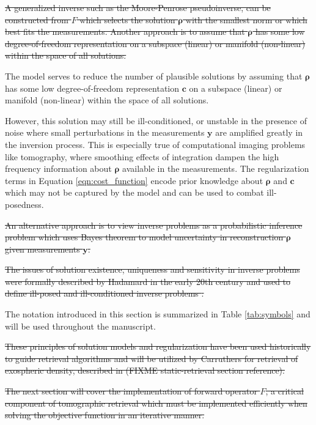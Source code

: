 \documentclass[pdflatex,twocolumn,sn-mathphys-num]{sn-jnl}
\newcommand{\st}[1]{{\color{red}\sout{#1}}}
\begin{document}
\st{A generalized inverse such as the Moore-Penrose pseudoinverse, can be constructed from $F$ which selects the solution $\bm{\rho}$ with the smallest norm or which best fits the measurements.  Another approach is to assume that $\bm{\rho}$ has some low degree-of-freedom representation on a subspace (linear) or manifold (non-linear) within the space of all solutions.}




The model serves to reduce the number of plausible solutions by assuming that $\bm{\rho}$ has some low degree-of-freedom representation $\bm{c}$ on a subspace (linear) or manifold (non-linear) within the space of all solutions.

However, this solution may still be ill-conditioned, or unstable in the presence of noise where small perturbations in the measurements $\bm{y}$ are amplified greatly in the inversion process.
    This is especially true of computational imaging problems like tomography, where smoothing effects of integration dampen the high frequency information about $\bm{\rho}$ available in the measurements.
The regularization terms in Equation \ref{eqn:cost_function} encode prior knowledge about $\bm{\rho}$ and $\bm{c}$ which may not be captured by the model and can be used to combat ill-posedness.

  \st{An alternative approach is to view inverse problems as a probabilistic inference problem which uses Bayes theorem to model uncertainty in reconstruction $\bm{\rho}$ given measurements $\bm{y}$.}

\st{The issues of solution existence, uniqueness and sensitivity in inverse problems were formally described by Hadamard in the early 20th century and used to define ill-posed and ill-conditioned inverse problems \cite{hadamard} \cite{illposed}.}

    The notation introduced in this section is summarized in Table \ref{tab:symbols} and will be used throughout the manuscript.

  \st{These principles of solution models and regularization have been used historically to guide retrieval algorithms and will be utilized
  by Carruthers for retrieval of exospheric density, described in
  (FIXME static-retrieval section reference).}

\st{The next section will cover the implementation of forward operator $F$, a critical component of tomographic retrieval which must be implemented efficiently when solving the objective function in an iterative manner.}
\end{document}
